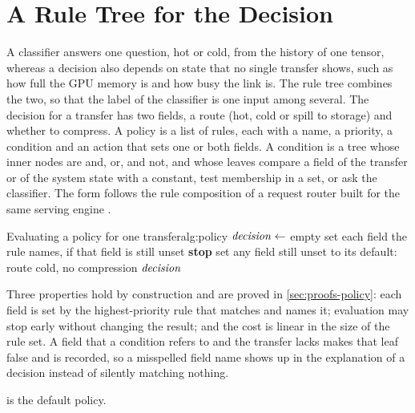 \section{A Rule Tree for the Decision}
\label{sec:policy}

A classifier answers one question, hot or cold, from the history of one
tensor, whereas a decision also depends on state that no single transfer
shows, such as how full the GPU memory is and how busy the link is. The rule
tree combines the two, so that the label of the classifier is one input among
several. The decision for a
transfer has two fields, a route (hot, cold or spill to storage) and whether
to compress. A policy is a list of rules, each with a name, a priority, a
condition and an action that sets one or both fields. A condition is a tree
whose inner nodes are and, or, and not, and whose leaves compare a field of
the transfer or of the system state with a constant, test membership in a
set, or ask the classifier. The form follows the rule composition of a
request router built for the same serving engine
\citep{liu2026router,wang2025router}.

\begin{pseudocode}{Evaluating a policy for one transfer}{alg:policy}
  \State $\mathit{decision} \gets$ empty
      \State set each field the rule names, if that field is still unset
        \State \textbf{stop}
      \EndIf
    \EndIf
  \EndFor
  \State set any field still unset to its default: route cold, no compression
  \State \Return $\mathit{decision}$
\end{pseudocode}

Three properties hold by construction and are proved in \cref{sec:proofs-policy}:
each field is set by the highest-priority rule that matches and names it;
evaluation may stop early without changing the result; and the cost is linear
in the size of the rule set. A field that a condition refers to and the
transfer lacks makes that leaf false and is recorded, so a misspelled field
name shows up in the explanation of a decision instead of silently matching
nothing.

 is the default policy.


